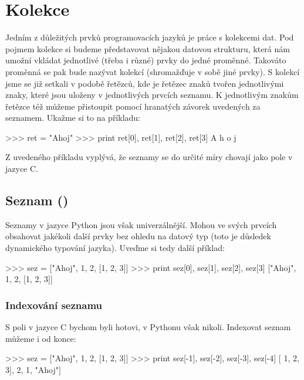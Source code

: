 

\section{Kolekce}
Jedním z důležitých prvků programovacích jazyků je práce s kolekcemi dat. Pod pojmem kolekce si budeme představovat nějakou datovou strukturu, která nám umožní vkládat jednotlivé (třeba i různé) prvky do jedné proměnné. Takováto proměnná se pak bude nazývat kolekcí (shromažďuje v sobě jiné prvky). S kolekcí jsme se již setkali v podobě řetězců, kde je řetězec znaků tvořen jednotlivými znaky, které jsou uloženy v jednotlivých prvcích seznamu. K jednotlivým znakům řetězce též můžeme přistoupit pomocí hranatých závorek uvedených za seznamem. Ukažme si to na příkladu:

\begin{python}
>>> ret = "Ahoj"
>>> print ret[0], ret[1], ret[2], ret[3]
A h o j
\end{python}

Z uvedeného příkladu vyplývá, že seznamy se do určité míry chovají jako pole v jazyce C.

\subsection{Seznam ()} \label{sec:list}

Seznamy v jazyce Python jsou však univerzálnější. Mohou ve svých prvcích obsahovat jakékoli další prvky bez ohledu na datový typ (toto je důsledek dynamického typování jazyka). Uveďme si tedy další příklad:

\begin{python}
>>> sez = ["Ahoj", 1, 2, [1, 2, 3]]
>>> print sez[0], sez[1], sez[2], sez[3]
["Ahoj", 1, 2, [1, 2, 3]]
\end{python}

\subsubsection{Indexování seznamu}
S poli v jazyce C bychom byli hotovi, v Pythonu však nikoli. Indexovat seznam můžeme i od konce:

\begin{python}
>>> sez = ["Ahoj", 1, 2, [1, 2, 3]]
>>> print sez[-1], sez[-2], sez[-3], sez[-4]
[ 1, 2, 3], 2, 1, "Ahoj"]
\end{python}

